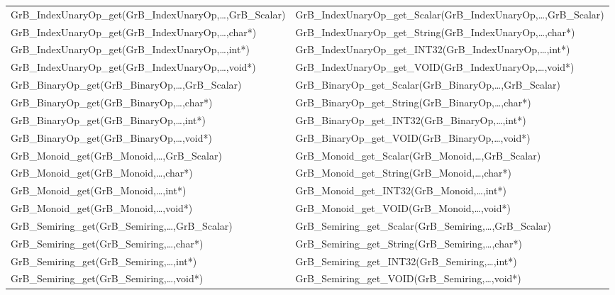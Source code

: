 \begin{table}[htb]
{\begin{tabular}{l|l}
{\sf GrB\_IndexUnaryOp\_get(GrB\_IndexUnaryOp,\ldots,GrB\_Scalar)}  & {\sf GrB\_IndexUnaryOp\_get\_Scalar(GrB\_IndexUnaryOp,\ldots,GrB\_Scalar)} \\
{\sf GrB\_IndexUnaryOp\_get(GrB\_IndexUnaryOp,\ldots,char*)}        & {\sf GrB\_IndexUnaryOp\_get\_String(GrB\_IndexUnaryOp,\ldots,char*)} \\
{\sf GrB\_IndexUnaryOp\_get(GrB\_IndexUnaryOp,\ldots,int*)}         & {\sf GrB\_IndexUnaryOp\_get\_INT32(GrB\_IndexUnaryOp,\ldots,int*)} \\
{\sf GrB\_IndexUnaryOp\_get(GrB\_IndexUnaryOp,\ldots,void*)}        & {\sf GrB\_IndexUnaryOp\_get\_VOID(GrB\_IndexUnaryOp,\ldots,void*)} \\
\hline

{\sf GrB\_BinaryOp\_get(GrB\_BinaryOp,\ldots,GrB\_Scalar)}  & {\sf GrB\_BinaryOp\_get\_Scalar(GrB\_BinaryOp,\ldots,GrB\_Scalar)} \\
{\sf GrB\_BinaryOp\_get(GrB\_BinaryOp,\ldots,char*)}        & {\sf GrB\_BinaryOp\_get\_String(GrB\_BinaryOp,\ldots,char*)} \\
{\sf GrB\_BinaryOp\_get(GrB\_BinaryOp,\ldots,int*)}         & {\sf GrB\_BinaryOp\_get\_INT32(GrB\_BinaryOp,\ldots,int*)} \\
{\sf GrB\_BinaryOp\_get(GrB\_BinaryOp,\ldots,void*)}        & {\sf GrB\_BinaryOp\_get\_VOID(GrB\_BinaryOp,\ldots,void*)} \\
\hline

{\sf GrB\_Monoid\_get(GrB\_Monoid,\ldots,GrB\_Scalar)}  & {\sf GrB\_Monoid\_get\_Scalar(GrB\_Monoid,\ldots,GrB\_Scalar)} \\
{\sf GrB\_Monoid\_get(GrB\_Monoid,\ldots,char*)}        & {\sf GrB\_Monoid\_get\_String(GrB\_Monoid,\ldots,char*)} \\
{\sf GrB\_Monoid\_get(GrB\_Monoid,\ldots,int*)}         & {\sf GrB\_Monoid\_get\_INT32(GrB\_Monoid,\ldots,int*)} \\
{\sf GrB\_Monoid\_get(GrB\_Monoid,\ldots,void*)}        & {\sf GrB\_Monoid\_get\_VOID(GrB\_Monoid,\ldots,void*)} \\
\hline

{\sf GrB\_Semiring\_get(GrB\_Semiring,\ldots,GrB\_Scalar)}  & {\sf GrB\_Semiring\_get\_Scalar(GrB\_Semiring,\ldots,GrB\_Scalar)} \\
{\sf GrB\_Semiring\_get(GrB\_Semiring,\ldots,char*)}        & {\sf GrB\_Semiring\_get\_String(GrB\_Semiring,\ldots,char*)} \\
{\sf GrB\_Semiring\_get(GrB\_Semiring,\ldots,int*)}         & {\sf GrB\_Semiring\_get\_INT32(GrB\_Semiring,\ldots,int*)} \\
{\sf GrB\_Semiring\_get(GrB\_Semiring,\ldots,void*)}        & {\sf GrB\_Semiring\_get\_VOID(GrB\_Semiring,\ldots,void*)} \\
\hline


\end{tabular}}
\end{table}
